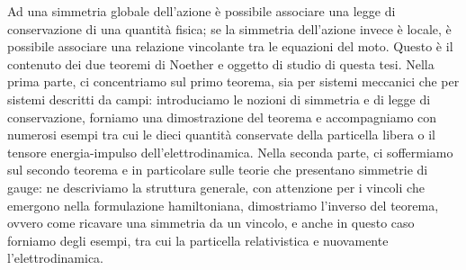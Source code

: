 \begin{Abstract}
\begin{changemargin}{1cm}{1cm}
    Ad una simmetria globale dell'azione è possibile associare una legge di conservazione di una quantità fisica; se la simmetria dell'azione invece è locale, è possibile associare una relazione vincolante tra le equazioni del moto. Questo è il contenuto dei due teoremi di Noether e oggetto di studio di questa tesi. Nella prima parte, ci concentriamo sul primo teorema, sia per sistemi meccanici che per sistemi descritti da campi: introduciamo le nozioni di simmetria e di legge di conservazione, forniamo una dimostrazione del teorema e accompagniamo con numerosi esempi tra cui le dieci quantità conservate della particella libera o il tensore energia-impulso dell'elettrodinamica. Nella seconda parte, ci soffermiamo sul secondo teorema e in particolare sulle teorie che presentano simmetrie di gauge: ne descriviamo la struttura generale, con attenzione per i vincoli che emergono nella formulazione hamiltoniana, dimostriamo l'inverso del teorema, ovvero come ricavare una simmetria da un vincolo, e anche in questo caso forniamo degli esempi, tra cui la particella relativistica e nuovamente l'elettrodinamica.
\end{changemargin}
\end{Abstract}